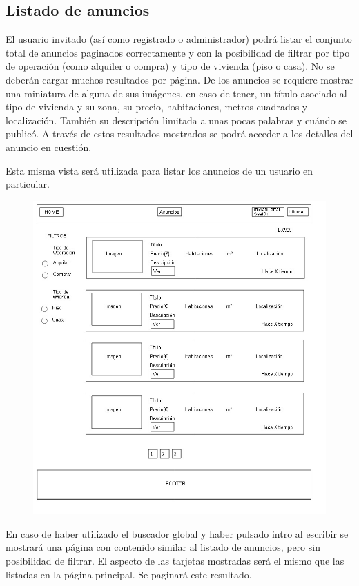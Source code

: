 \subsection{Listado de anuncios}
El usuario invitado (as\'{i} como registrado o administrador) podr\'{a} listar el conjunto total de anuncios paginados correctamente y con la posibilidad de filtrar por tipo de operaci\'{o}n (como alquiler o compra) y tipo de vivienda (piso o casa). No se deber\'{a}n cargar muchos resultados por p\'{a}gina. De los anuncios se requiere mostrar una miniatura de alguna de sus im\'{a}genes, en caso de tener, un t\'{i}tulo asociado al tipo de vivienda y su zona, su precio, habitaciones, metros cuadrados y localizaci\'{o}n. Tambi\'{e}n su descripci\'{o}n limitada a unas pocas palabras y cu\'{a}ndo se public\'{o}. A trav\'{e}s de estos resultados mostrados se podr\'{a} acceder a los detalles del anuncio en cuesti\'{o}n.

Esta misma vista ser\'{a} utilizada para listar los anuncios de un usuario en particular.


\begin{figure}[h!]
\centering
\includegraphics[width=.8\textwidth]{Img/VisionAplicacion/vision_3.jpg}
\end{figure}

En caso de haber utilizado el buscador global y haber pulsado intro al escribir se mostrar\'{a} una p\'{a}gina con contenido similar al listado de anuncios, pero sin posibilidad de filtrar. El aspecto de las tarjetas mostradas ser\'{a} el mismo que las listadas en la p\'{a}gina principal. Se paginar\'{a} este resultado.

